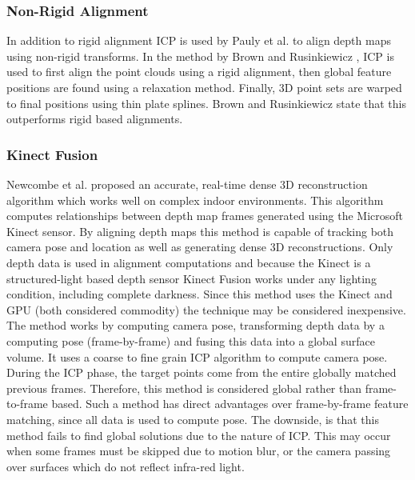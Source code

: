 \subsubsection{Non-Rigid Alignment}

In addition to rigid alignment ICP is used by Pauly et al. \cite{Pauly05Example,Brown07Global} to align depth maps using non-rigid transforms. In the method by Brown and Rusinkiewicz \cite{Brown07Global}, ICP is used to first align the point clouds using a rigid alignment, then global feature positions are found using a relaxation method. Finally, 3D point sets are warped to final positions using thin plate splines. Brown and Rusinkiewicz state that this outperforms rigid based alignments.


\subsubsection{Kinect Fusion}

Newcombe et al. \cite{Newcombe11Kinectfusion,Izadi11Kinectfusion} proposed an accurate, real-time dense 3D reconstruction algorithm which works well on complex indoor environments. This algorithm computes relationships between depth map frames generated using the Microsoft Kinect \cite{Zhang12Microsoft} sensor. By aligning depth maps this method is capable of tracking both camera pose and location as well as generating dense 3D reconstructions. Only depth data is used in alignment computations and because the Kinect is a structured-light based depth sensor Kinect Fusion works under any lighting condition, including complete darkness. Since this method uses the Kinect and GPU (both considered commodity) the technique may be considered inexpensive. \\

The method works by computing camera pose, transforming depth data by a computing pose (frame-by-frame) and fusing this data into a global surface volume. It uses a coarse to fine grain ICP algorithm to compute camera pose. During the ICP phase, the target points come from the entire globally matched previous frames. Therefore, this method is considered global rather than frame-to-frame based. Such a method has direct advantages over frame-by-frame feature matching, since all data is used to compute pose. The downside, is that this method fails to find global solutions due to the nature of ICP. This may occur when some frames must be skipped due to motion blur, or the camera passing over surfaces which do not reflect infra-red light. \\

